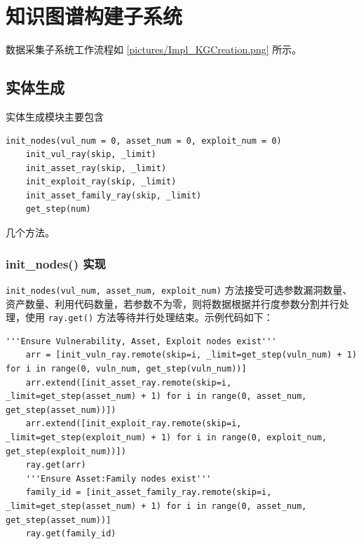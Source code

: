 \documentclass[a4paper,AutoFakeBold,oneside,12pt]{book}
\begin{document}
\section{知识图谱构建子系统}

数据采集子系统工作流程如 \ref{pictures/Impl_KGCreation.png} 所示。


\subsection{实体生成}

实体生成模块主要包含
\begin{lstlisting}[style=lgeneral]
	init_nodes(vul_num = 0, asset_num = 0, exploit_num = 0)
	init_vul_ray(skip, _limit)
	init_asset_ray(skip, _limit)
	init_exploit_ray(skip, _limit)
	init_asset_family_ray(skip, _limit)
	get_step(num)
\end{lstlisting}
几个方法。

\subsubsection{init{\_}nodes() 实现}

\lstinline|init_nodes(vul_num, asset_num, exploit_num)| 方法接受可选参数漏洞数量、资产数量、利用代码数量，若参数不为零，则将数据根据并行度参数分割并行处理，使用 \lstinline|ray.get()| 方法等待并行处理结束。示例代码如下：
\begin{lstlisting}[style=lgeneral]
	'''Ensure Vulnerability, Asset, Exploit nodes exist'''
	arr = [init_vuln_ray.remote(skip=i, _limit=get_step(vuln_num) + 1) for i in range(0, vuln_num, get_step(vuln_num))]
	arr.extend([init_asset_ray.remote(skip=i, _limit=get_step(asset_num) + 1) for i in range(0, asset_num, get_step(asset_num))])
	arr.extend([init_exploit_ray.remote(skip=i, _limit=get_step(exploit_num) + 1) for i in range(0, exploit_num, get_step(exploit_num))])
	ray.get(arr)
	'''Ensure Asset:Family nodes exist'''
	family_id = [init_asset_family_ray.remote(skip=i, _limit=get_step(asset_num) + 1) for i in range(0, asset_num, get_step(asset_num))]
	ray.get(family_id)
\end{lstlisting}
\end{document}

